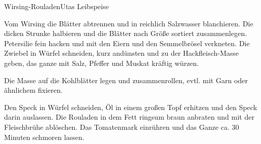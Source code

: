 \begin{recipe}{Wirsing-Rouladen}{Utas Leibspeise}
  \label{Wirsing-Rouladen}
  \inglist


  \steps
  Vom Wirsing die Blätter abtrennen und in reichlich Salzwasser blanchieren. Die dicken
  Strunke halbieren und die Blätter nach Größe sortiert zusammenlegen. Petersilie fein 
  hacken und mit den Eiern und den Semmelbrösel verkneten. Die Zwiebel in Würfel
  schneiden, kurz andünsten und zu der Hackfleisch-Masse geben, das ganze mit Salz, Pfeffer 
  und Muskat kräftig würzen.

  Die Masse auf die Kohlblätter legen und zusammenrollen, evtl. mit Garn oder ähnlichem 
  fixieren.

  Den Speck in Würfel schneiden, Öl in einem großen Topf erhitzen und den Speck darin 
  auslassen. Die Rouladen in dem Fett ringsum braun anbraten und mit der Fleischbrühe 
  ablöschen. Das Tomatenmark einrühren und das Ganze ca. 30 Minuten schmoren lassen.
  
\end{recipe}

